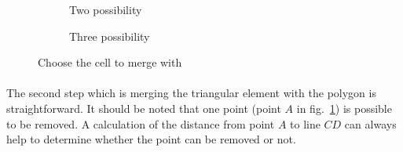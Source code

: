 \begin{figure}[!ht]    
    \begin{subfigure}[b]{0.5\linewidth}
        \centering
        \caption{Two possibility}
    \end{subfigure}
    \begin{subfigure}[b]{0.5\linewidth}
        \centering
        \caption{Three possibility}
        \label{adap_fig:mt_choose_3p}
    \end{subfigure}    
    \caption[Choose the cell to merge with]{Choose the cell to merge with}
    \label{adap_fig:mt_choose}
\end{figure}

\paragraph{}
The second step which is merging the triangular element with the polygon is straightforward.
It should be noted that one point (point $A$ in fig.~\ref{adap_fig:mt_choose_3p}) is possible to be removed.
A calculation of the distance from point $A$ to line $CD$ can always help to determine whether the point can be removed or not.

